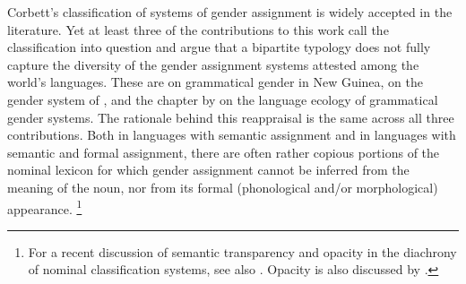 \documentclass[output=collectionpaper]{langsci/langscibook}
\begin{document}
Corbett's classification of systems of gender assignment is widely accepted in the literature. Yet at least three of the contributions to this work call the classification into question and argue that a bipartite typology does not fully capture the diversity of the gender assignment systems attested among the world's languages. These are  on grammatical gender in New Guinea,  on the gender system of , and the chapter by  on the language ecology of grammatical gender systems. The rationale behind this reappraisal is the same across all three contributions. Both in languages with semantic assignment and in languages with semantic and formal assignment, there are often rather copious portions of the nominal lexicon for which gender assignment cannot be inferred from the meaning of the noun, nor from its formal (phonological and/or morphological) appearance.%
\footnote{%
For a recent discussion of semantic transparency and opacity in the diachrony of nominal classification systems, see also \cite{Seifart2018}. Opacity is also discussed by \cite{Passer2016b}.
}%
\end{document}
